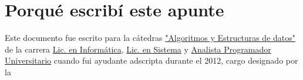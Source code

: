 \section{Porqué escribí este apunte}
Este documento fue escrito para la cátedras \href{http://info.unlp.edu.ar/wp-content/uploads/2018/05/Algoritmos-y-Estructuras-de-Datos.pdf}{"Algoritmos y Estructuras de datos"} de la carrera \href{http://info.unlp.edu.ar/plan-2012/}{Lic. en Informática}, \href{http://info.unlp.edu.ar/plan-2012-sistemas/}{Lic. en Sistema} y \href{http://info.unlp.edu.ar/carreras-gradoarticulo/plan-2015-analista-programador-universitario-nuevo/}{Analista Programador Universitario} cuando fui ayudante adscripta durante el 2012, cargo designado por la \href{https://unlp.edu.ar/}{\color{cyan}{Universidad Nacional de La Plata}}
